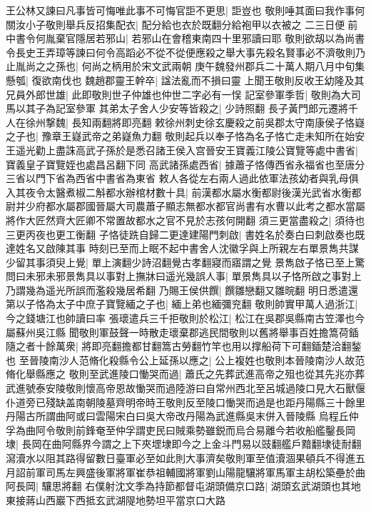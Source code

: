 王公林又諫曰凡事皆可悔唯此事不可悔官詎不更思|{
	詎豈也}
敬則唾其面曰我作事何關汝小子敬則舉兵反招集配衣|{
	配分給也衣於既翻分給袍甲以衣被之}
二三日便前中書令何胤棄官隱居若邪山|{
	若邪山在會稽東南四十里邪讀曰耶}
敬則欲刼以為尚書令長史王弄璋等諫曰何令高蹈必不從不從便應殺之舉大事先殺名賢事必不濟敬則乃止胤尚之之孫也|{
	何尚之柄用於宋文武兩朝}
庚午魏發州郡兵二十萬人期八月中旬集懸瓠|{
	復欲南伐也}
魏趙郡靈王幹卒|{
	諡法亂而不損曰靈}
上聞王敬則反收王幼隆及其兄員外郎世雄|{
	此即敬則世子仲雄也仲世二字必有一悮}
記室參軍季哲|{
	敬則為大司馬以其子為記室參軍}
其弟太子舍人少安等皆殺之|{
	少詩照翻}
長子黃門郎元遷將千人在徐州撃魏|{
	長知兩翻將即亮翻}
敕徐州刺史徐玄慶殺之前吳郡太守南康侯子恪嶷之子也|{
	豫章王嶷武帝之弟嶷魚力翻}
敬則起兵以奉子恪為名子恪亡走未知所在始安王遥光勸上盡誅高武子孫於是悉召諸王侯入宫晉安王寶義江陵公寶覽等處中書省|{
	寶義皇子寶覽姪也處昌呂翻下同}
高武諸孫處西省|{
	據蕭子恪傳西省永福省也至唐分三省以門下省為西省中書省為東省}
敕人各從左右兩人過此依軍法孩幼者與乳母俱入其夜令太醫煮椒二斛都水辦棺材數十具|{
	前漢都水屬水衡都尉後漢光武省水衡都尉并少府都水屬郡國晉屬大司農蕭子顯志無都水都官尚書有水曹以此考之都水當屬將作大匠然齊大匠卿不常置故都水之官不見於志孩何開翻}
須三更當盡殺之|{
	須待也三更丙夜也更工衡翻}
子恪徒跣自歸二更達建陽門刺啟|{
	書姓名於奏白曰刺啟奏也既達姓名又啟陳其事}
時刻已至而上眠不起中書舍人沈徽孚與上所親左右單景雋共謀少留其事須臾上覺|{
	單上演翻少詩沼翻覺古孝翻寢而寤謂之覺}
景雋啟子恪已至上驚問曰未邪未邪景雋具以事對上撫牀曰遥光幾誤人事|{
	單景雋具以子恪所啟之事對上乃謂幾為遥光所誤而濫殺幾居希翻}
乃賜王侯供饌|{
	饌雛戀翻又雛晥翻}
明日悉遣還第以子恪為太子中庶子寶覽緬之子也|{
	緬上弟也緬彌兖翻}
敬則帥實甲萬人過浙江|{
	今之錢塘江也帥讀曰率}
張瓌遣兵三千拒敬則於松江|{
	松江在吳郡吳縣南古笠澤也今屬蘇州吳江縣}
聞敬則軍鼓聲一時散走瓌棄郡逃民間敬則以舊將舉事百姓擔篙荷鍤隨之者十餘萬衆|{
	將即亮翻擔都甘翻篙古勞翻竹竿也用以撑船荷下可翻鍤楚洽翻鍫也}
至晉陵南沙人范脩化殺縣令公上延孫以應之|{
	公上複姓也敬則本晉陵南沙人故范脩化舉縣應之}
敬則至武進陵口慟哭而過|{
	蕭氏之先葬武進高帝之殂也從其先兆亦葬武進號泰安陵敬則懷高帝恩故慟哭而過陸游曰自常州西北至呂城過陵口見大石獸偃仆道旁已殘缺盖南朝陵墓齊明帝時王敬則反至陵口慟哭而過是也距丹陽縣三十餘里丹陽古所謂曲阿或曰雲陽宋白曰吳大帝改丹陽為武進縣吳末併入晉陵縣}
烏程丘仲孚為曲阿令敬則前鋒奄至仲孚謂吏民曰賊乘勢雖鋭而烏合易離今若收船艦鑿長岡埭|{
	長岡在曲阿縣界今謂之上下夾堽埭即今之上金斗門易以豉翻艦戶黯翻埭徒耐翻}
瀉瀆水以阻其路得留數日臺軍必至如此則大事濟矣敬則軍至值瀆涸果頓兵不得進五月詔前軍司馬左興盛後軍將軍崔恭祖輔國將軍劉山陽龍驤將軍馬軍主胡松築壘於曲阿長岡|{
	驤思將翻}
右僕射沈文季為持節都督屯湖頭備京口路|{
	湖頭玄武湖頭也其地東接蔣山西巖下西抵玄武湖隄地勢坦平當京口大路}
